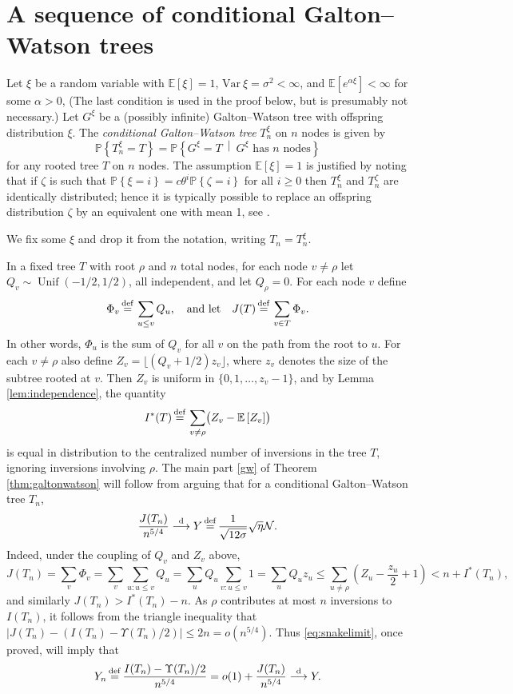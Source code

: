 \documentclass[11pt]{article}
\newcommand{\E}[1]{\mathbb{E} \left[#1\right]}
\newcommand{\va}{{\mathrm{Var}}}
\newcommand\cN{{\cal N}}
\def\QQ{Q}
\def\YY{Y}
\def\U{\Upsilon}
\def\F{\Phi}
\def\a{\alpha}
\def\z{\zeta}
\def\th{\theta}
\def\r{\rho}
\def\s{\sigma}
\newcommand\Prob[1]{{\mathbb{P}\left\{#1\right\}}}
\numberwithin{theorem}{section}
\theoremstyle{definition}
\newcommand{\floor}[1]{\lfloor #1 \rfloor}
\newcommand{\inlaw}{\dto}%
\newcommand{\eqd}{\,{\buildrel {\mathrm{def}} \over =}\,}
\newcommand{\Unif}{\mathop{\mathrm{Unif}}}
\numberwithin{equation}{section}
\newcommand\bigpar[1]{\bigl(#1\bigr)}
\newcommand{\too}{\longrightarrow}
\newcommand\dto{\overset{\mathrm{d}}{\too}}
\begin{document}
\section{A sequence of conditional Galton--Watson trees}\label{sec:galtonwatson}

Let $\xi$ be a random variable with $\E{\xi} = 1$, 
$\va\ \xi = \s^2 <\infty$,
and $\E{e^{\a\xi}}<\infty$ for some $\a>0$, 
(The last condition is used in the proof below, but is presumably not
necessary.) 
Let $G^\xi$ be a (possibly infinite) Galton--Watson tree with offspring distribution $\xi$. The {\em conditional Galton--Watson tree} $T^\xi_n$ on $n$ nodes is given by
$$
\Prob{T^\xi_n = T} = \Prob{G^\xi = T\ \middle|\ G^\xi \text{ has $n$ nodes}}
$$
for any rooted tree $T$ on $n$ nodes. The assumption $\E{\xi} = 1$ is justified by noting that if $\zeta$
is such that $\Prob{\xi = i} = c\th^i\Prob{\zeta=i}$ for all $i\geq 0$ then $T^\xi_n$ and $T^\z_n$
are identically distributed; 
hence it is typically possible to replace an
offspring distribution $\zeta$ by an equivalent one with mean 1, 
see \cite[Sec.\ 4]{j12}. 

We fix some $\xi$ and drop it from the notation, writing $T_n =
T^\xi_n$.

In a fixed tree $T$ with root $\r$ and $n$ total nodes, for each node $v\neq \r$ let $\QQ_v\sim\Unif(-1/2, 1/2)$, all independent, and let $\QQ_\r = 0$. For each node $v$ define
$$
\F_v \eqd \sum_{u \leq v} \QQ_u, \quad 
\text{and let}\quad J(T) \eqd \sum_{v \in T} \F_v.
$$
In other words, \(\F_u\) is the sum of $\QQ_v$ for all $v$ on the path from the root to \(u\).
For each $v\neq \r$ also define $Z_v = \floor{(\QQ_v + 1/2)z_v}$, where $z_v$ denotes the size of the
subtree rooted at $v$. Then $Z_v$ is
uniform in $\{0,1,\dots,z_v-1\}$, and by Lemma \ref{lem:independence}, the quantity
$$
I^*(T) \eqd \sum_{v\neq \r} \bigpar{Z_v - \E{Z_v}}
$$
is equal in distribution to the centralized number of inversions in the tree
$T$, ignoring inversions 
involving $\r$. The main part \eqref{gw} of Theorem \ref{thm:galtonwatson} will follow from arguing that for a conditional
Galton--Watson tree $T_n$,
\begin{equation}\label{eq:snakelimit}
\frac{J(T_n)}{n^{5/4}} \dto \YY \eqd \frac{1}{\sqrt{12\s}}\sqrt{\eta} \cN.
\end{equation}
Indeed, under the coupling of $\QQ_v$ and $Z_v$ above,
$$
J(T_n) = \sum_v \F_v
= \sum_v \sum_{u:u \le v} \QQ_u
= \sum_u \QQ_u \sum_{v:u \le v} 1
= \sum_u \QQ_u z_u
\leq \sum_{u \neq \r} \left(Z_u - \frac{z_u}{2} + 1\right)
< n + I^*(T_n)
,
$$
and similarly $J(T_n) > I^*(T_n) - n$. As $\r$ contributes at most $n$ inversions to $I(T_n)$, it
follows from the triangle inequality that $|J(T_n) - (I(T_n)-\U(T_n)/2)| \leq 2n = o(n^{5/4})$.
Thus \eqref{eq:snakelimit}, once proved, will imply that
\[
    \YY_n 
    \eqd 
    \frac{I(T_n)-\U(T_n)/2}{n^{5/4}}
    =
    o(1) + \frac{J(T_n)}{n^{5/4}}
    \inlaw
    \YY.
\]
\end{document}
